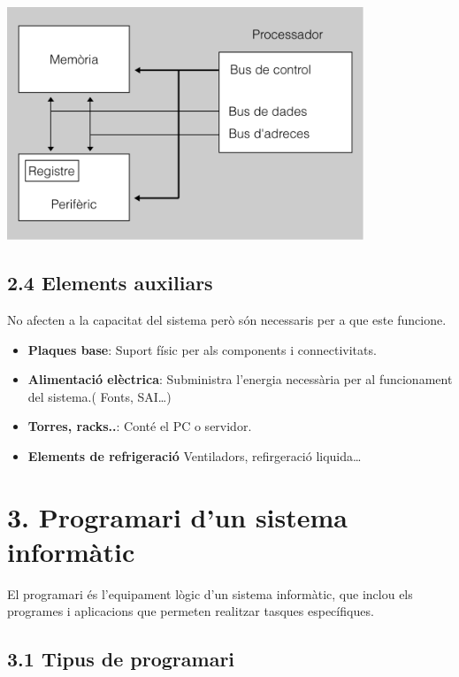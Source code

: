 \documentclass[
  12 pt,
  a4paper,
]{article}
\providecommand{\tightlist}{%
  \setlength{\itemsep}{0pt}\setlength{\parskip}{0pt}}
\begin{document}
\includegraphics[width=0.8\textwidth,height=\textheight]{png/esquema.png}

\subsection{2.4 Elements auxiliars}\label{elements-auxiliars}

No afecten a la capacitat del sistema però són necessaris per a que este
funcione.

\begin{itemize}
\tightlist
\item
  \textbf{Plaques base}: Suport físic per als components i
  connectivitats.
\item
  \textbf{Alimentació elèctrica}: Subministra l'energia necessària per
  al funcionament del sistema.( Fonts, SAI\ldots)
\item
  \textbf{Torres, racks..}: Conté el PC o servidor.
\item
  \textbf{Elements de refrigeració} Ventiladors, refirgeració
  liquida\ldots{}
\end{itemize}

\section{3. Programari d'un sistema
informàtic}\label{programari-dun-sistema-informuxe0tic}

El programari és l'equipament lògic d'un sistema informàtic, que inclou
els programes i aplicacions que permeten realitzar tasques específiques.

\subsection{3.1 Tipus de programari}\label{tipus-de-programari}
\end{document}
